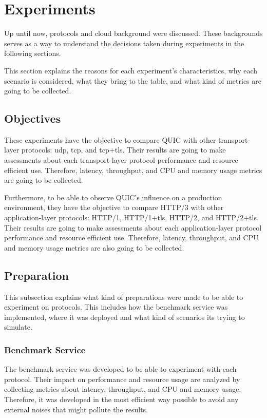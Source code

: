 \section{Experiments}

Up until now, protocols and cloud background were discussed. These backgrounds serves as a way to understand the decisions taken during experiments in the following sections.

This section explains the reasons for each experiment's characteristics, why each scenario is considered, what they bring to the table, and what kind of metrics are going to be collected.

\subsection{Objectives}

These experiments have the objective to compare QUIC with other transport-layer protocols: \gls{udp}, \gls{tcp}, and \gls{tcp}+\gls{tls}. Their results are going to make assessments about each transport-layer protocol performance and resource efficient use. Therefore, latency, throughput, and CPU and memory usage metrics are going to be collected.

Furthermore, to be able to observe QUIC's influence on a production environment, they have the objective to compare HTTP/3 with other application-layer protocols: HTTP/1, HTTP/1+\gls{tls}, HTTP/2, and HTTP/2+\gls{tls}. Their results are going to make assessments about each application-layer protocol performance and resource efficient use. Therefore, latency, throughput, and CPU and memory usage metrics are also going to be collected.

\subsection{Preparation}

This subsection explains what kind of preparations were made to be able to experiment on protocols. This includes how the benchmark service was implemented, where it was deployed and what kind of scenarios its trying to simulate. 

\subsubsection{Benchmark Service}

The benchmark service was developed to be able to experiment with each protocol. Their impact on performance and resource usage are analyzed by collecting metrics about latency, throughput, and CPU and memory usage. Therefore, it was developed in the most efficient way possible to avoid any external noises that might pollute the results.

